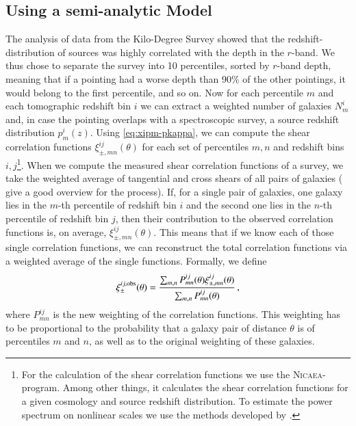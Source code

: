\subsection{Using a semi-analytic Model}
The analysis of data from the Kilo-Degree Survey showed that the redshift-distribution of sources was highly correlated with the depth in the $r$-band. We thus chose to separate the survey into 10 percentiles, sorted by $r$-band depth, meaning that if a pointing had a worse depth than 90\% of the other pointings, it would belong to the first percentile, and so on. Now for each percentile $m$ and each tomographic redshift bin $i$ we can extract a weighted number of galaxies $N^i_m$ and, in case the pointing overlaps with a spectroscopic survey, a source redshift distribution $p^i_m(z)$. Using \eqref{eq:xipm-pkappa}, we can compute the shear correlation functions $\xi_{\pm,mn}^{ij}(\theta)$ for each set of percentiles $m,n$ and redshift bins $i,j$\footnote{For the calculation of the shear correlation functions we use the \textsc{Nicaea}-program. Among other things, it calculates the shear correlation functions for a given cosmology and source redshift distribution. To estimate the power spectrum on nonlinear scales we use the methods developed by \citet{2012ApJ...761..152T}.}. When we compute the measured shear correlation functions of a survey, we take the weighted average of tangential and cross shears of all pairs of galaxies (\citet{2017MNRAS.465.1454H} give a good overview for the process). If, for a single pair of galaxies, one galaxy lies in the $m$-th percentile of redshift bin $i$ and the second one lies in the $n$-th percentile of redshift bin $j$, then their contribution to the observed correlation functions is, on average, $\xi_{\pm,mn}^{ij}(\theta)$. This means that if we know each of those single correlation functions, we can reconstruct the total correlation functions via a weighted average of the single functions. Formally, we define \[
\xi_\pm^{ij,\rm{obs}}(\theta) = \frac{\sum_{m,n} P_{mn}^{ij}(\theta)\xi_{\pm,mn}^{ij}(\theta)}{\sum_{m,n} P_{mn}^{ij}(\theta)}\, ,
\label{eq:def_xiobs}
\]
where $P_{mn}^{ij}$ is the new weighting of the correlation functions. This weighting has to be proportional to the probability that a galaxy pair of distance $\theta$ is of percentiles $m$ and $n$, as well as to the original weighting of these galaxies.


